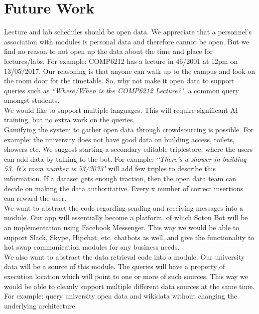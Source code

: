 \documentclass[journal, a4paper]{IEEEtran}
\begin{document}
\section{Future Work}

Lecture and lab schedules should be open data. We appreciate that a personnel's association with modules is personal data and therefore cannot be open. But we find no reason to not open up the data about the time and place for lectures/labs. For example: COMP6212 has a lecture in 46/2001 at 12pm on 13/05/2017. Our reasoning is that anyone can walk up to the campus and look on the room door for the timetable. So, why not make it open data to support queries such as \textit{``Where/When is the COMP6212 Lecture?"}, a common query amongst students.\\

We would like to support multiple languages. This will require significant AI training, but no extra work on the queries.\\

Gamifying the system to gather open data through crowdsourcing is possible. For example: the university does not have good data on building access, toilets, showers etc. We suggest starting a secondary editable triplestore, where the users can add data by talking to the bot. For example: \textit{``There's a shower in building 53. It's room number is 53/3033"} will add few triples to describe this information. If a dataset gets enough traction, then the open data team can decide on making the data authoritative. Every x number of correct insertions can reward the user.\\

We want to abstract the code regarding sending and receiving messages into a module. Our app will essentially become a platform, of which Soton Bot will be an implementation using Facebook Messenger. This way we would be able to support Slack, Skype, Hipchat, etc. chatbots as well, and give the functionality to hot swap communication modules for any business needs.\\

We also want to abstract the data retrieval code into a module. Our university data will be a source of this module. The queries will have a property of execution location which will point to one or more of such sources. This way we would be able to cleanly support multiple  different data sources at the same time. For example: query university open data and wikidata without changing the underlying architecture.\\
\end{document}
